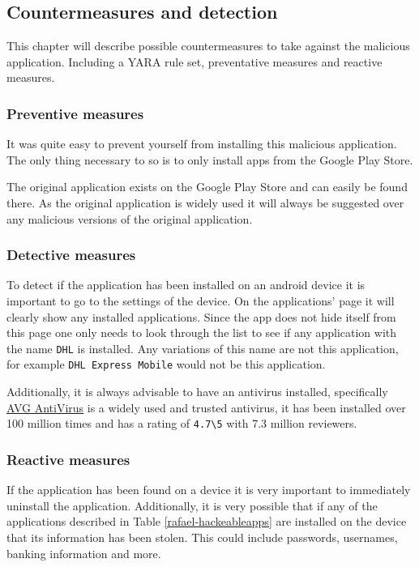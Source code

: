 \subsection{Countermeasures and detection}

This chapter will describe possible countermeasures to take against the malicious application.
Including a YARA rule set, preventative measures and reactive measures.

\subsubsection{Preventive measures}

It was quite easy to prevent yourself from installing this malicious application.
The only thing necessary to so is to only install apps from the Google Play Store.

The original application exists on the Google Play Store and can easily be found there.
As the original application is widely used it will always be suggested over any malicious versions of the original application.

\subsubsection{Detective measures}

To detect if the application has been installed on an android device it is important to go to the settings of the device.
On the applications' page it will clearly show any installed applications.
Since the app does not hide itself from this page one only needs to look through the list to see if any application with the name \texttt{DHL} is installed.
Any variations of this name are not this application, for example \texttt{DHL Express Mobile} would not be this application.

Additionally, it is always advisable to have an antivirus installed,
specifically \href{https://play.google.com/store/apps/details?id=com.antivirus&hl=en&gl=US}{AVG AntiVirus} is a widely used and trusted antivirus,
it has been installed over 100 million times and has a rating of \texttt{4.7\textbackslash5} with 7.3 million reviewers.

\subsubsection{Reactive measures}

If the application has been found on a device it is very important to immediately uninstall the application.
Additionally, it is very possible that if any of the applications described in Table \ref{rafael-hackeableapps} are installed on the device that its information has been stolen.
This could include passwords, usernames, banking information and more.

